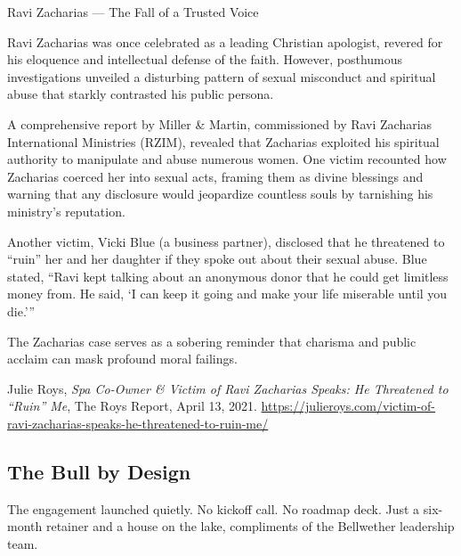 \begin{HistoricalSidebar}{Ravi Zacharias --- The Fall of a Trusted Voice}

    Ravi Zacharias was once celebrated as a leading Christian apologist, revered for his eloquence and intellectual defense of the faith. However, posthumous investigations unveiled a disturbing pattern of sexual misconduct and spiritual abuse that starkly contrasted his public persona.
    
    \medskip
    
    A comprehensive report by Miller \& Martin, commissioned by Ravi Zacharias International Ministries (RZIM), revealed that Zacharias exploited his spiritual authority to manipulate and abuse numerous women. One victim recounted how Zacharias coerced her into sexual acts, framing them as divine blessings and warning that any disclosure would jeopardize countless souls by tarnishing his ministry's reputation.
    
    \medskip
    
    Another victim, Vicki Blue (a business partner), disclosed that he threatened to ``ruin'' her and her daughter if they spoke out about their sexual abuse. Blue stated, “Ravi kept talking about an anonymous donor that he could get limitless money from. He said, ‘I can keep it going and make your life miserable until you die.’” \cite{blue2021}
    
    \medskip
    
    The Zacharias case serves as a sobering reminder that charisma and public acclaim can mask profound moral failings.
    
    \begin{thebibliography}{9}
    Julie Roys, \textit{Spa Co-Owner \& Victim of Ravi Zacharias Speaks: He Threatened to “Ruin” Me}, The Roys Report, April 13, 2021. \url{https://julieroys.com/victim-of-ravi-zacharias-speaks-he-threatened-to-ruin-me/}
    \end{thebibliography}
\end{HistoricalSidebar}
    
\medskip


\subsection{The Bull by Design}

The engagement launched quietly.  
No kickoff call. No roadmap deck.  
Just a six-month retainer and a house on the lake, compliments of the Bellwether leadership team.

